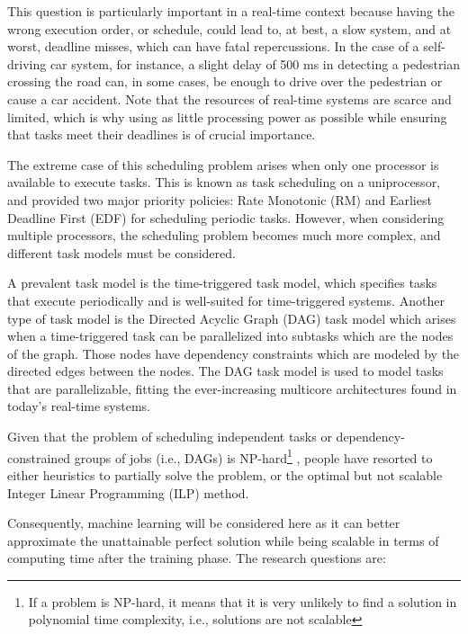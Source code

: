 This question is particularly important in a real-time context 
because having the wrong execution order, or schedule, could lead 
to, at best, a slow system, and at worst, deadline misses, which 
can have fatal repercussions. In the case of a self-driving car 
system, for instance, a slight delay of 500 ms in detecting a pedestrian 
crossing the road can, in some cases, be enough to drive over 
the pedestrian or cause a car accident. Note that the resources of 
real-time systems are scarce and limited, which is why using as 
little processing power as possible while ensuring that tasks meet 
their deadlines is of crucial importance.

The extreme case of this scheduling problem arises when only one 
processor is available to execute tasks. This is known as task 
scheduling on a uniprocessor, and \cite{liu1973scheduling} 
provided two major priority policies: Rate Monotonic (RM) and 
Earliest Deadline First (EDF) for scheduling periodic tasks. 
However, when considering multiple processors, the scheduling 
problem becomes much more complex, and different task models must 
be considered.

A prevalent task model is the time-triggered task model, 
which specifies tasks that execute periodically and is well-suited 
for time-triggered systems. Another type of task model is the 
Directed Acyclic Graph (DAG) task model which arises when a time-triggered task
can be parallelized into subtasks which are the nodes of the graph.
Those nodes have dependency constraints which are modeled by the directed edges between the nodes.
The DAG task model is used to model tasks that are parallelizable\cite{baruah1993PFair},
fitting the ever-increasing multicore architectures found in today's real-time systems. 

Given that the problem of scheduling independent tasks or dependency-constrained groups of jobs (i.e., DAGs) is NP-hard\footnote{If a problem is 
NP-hard, it means that it is very unlikely to find a solution in 
polynomial time complexity, i.e., solutions are not scalable}\cite{du1989schedNPhard}
\cite{ULLMAN1975NPhard}, 
people have resorted to either heuristics 
to partially solve the problem,
or the optimal but not scalable Integer Linear Programming
(ILP) method.

Consequently, machine learning will be considered here as it can 
better approximate the unattainable perfect solution while being 
scalable in terms of computing time after the training phase. 
The research questions are:


